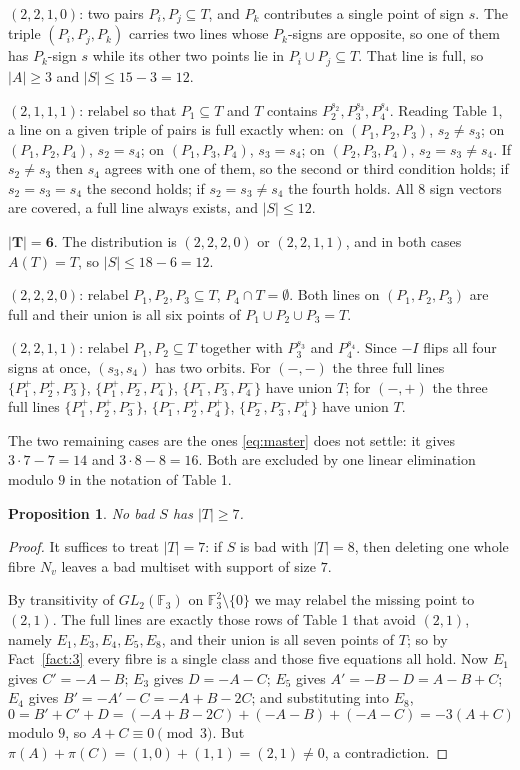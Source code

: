 \documentclass[11pt]{amsart}
\newtheorem{proposition}[theorem]{Proposition}
\newcommand{\FF}{\mathbb F}
\newcommand{\pio}{\pi}
\begin{document}
\emph{$(2,2,1,0)$}: two pairs $P_i,P_j\subseteq T$, and $P_k$ contributes a
single point of sign $s$. The triple $(P_i,P_j,P_k)$ carries two lines whose
$P_k$-signs are opposite, so one of them has $P_k$-sign $s$ while its other two
points lie in $P_i\cup P_j\subseteq T$. That line is full, so $|A|\ge3$ and
$|S|\le15-3=12$.

\emph{$(2,1,1,1)$}: relabel so that $P_1\subseteq T$ and $T$ contains
$P_2^{s_2},P_3^{s_3},P_4^{s_4}$. Reading Table 1, a line on a given triple of
pairs is full exactly when: on $(P_1,P_2,P_3)$, $s_2\ne s_3$; on
$(P_1,P_2,P_4)$, $s_2=s_4$; on $(P_1,P_3,P_4)$, $s_3=s_4$; on $(P_2,P_3,P_4)$,
$s_2=s_3\ne s_4$. If $s_2\ne s_3$ then $s_4$ agrees with one of them, so the
second or third condition holds; if $s_2=s_3=s_4$ the second holds; if
$s_2=s_3\ne s_4$ the fourth holds. All $8$ sign vectors are covered, a full
line always exists, and $|S|\le12$.

\smallskip
\noindent$\boldsymbol{|T|=6}$. The distribution is $(2,2,2,0)$ or $(2,2,1,1)$,
and in both cases $A(T)=T$, so $|S|\le18-6=12$.

\emph{$(2,2,2,0)$}: relabel $P_1,P_2,P_3\subseteq T$, $P_4\cap T=\emptyset$.
Both lines on $(P_1,P_2,P_3)$ are full and their union is all six points of
$P_1\cup P_2\cup P_3=T$.

\emph{$(2,2,1,1)$}: relabel $P_1,P_2\subseteq T$ together with $P_3^{s_3}$ and
$P_4^{s_4}$. Since $-I$ flips all four signs at once, $(s_3,s_4)$ has two
orbits. For $(-,-)$ the three full lines $\{P_1^+,P_2^+,P_3^-\}$,
$\{P_1^+,P_2^-,P_4^-\}$, $\{P_1^-,P_3^-,P_4^-\}$ have union $T$; for $(-,+)$
the three full lines $\{P_1^+,P_2^+,P_3^-\}$, $\{P_1^-,P_2^+,P_4^+\}$,
$\{P_2^-,P_3^-,P_4^+\}$ have union $T$.

\smallskip
The two remaining cases are the ones \eqref{eq:master} does not settle: it gives
$3\cdot7-7=14$ and $3\cdot8-8=16$. Both are excluded by one linear elimination
modulo $9$ in the notation of Table 1.

\begin{proposition}\label{prop:T7}
No bad $S$ has $|T|\ge7$.
\end{proposition}

\begin{proof}
It suffices to treat $|T|=7$: if $S$ is bad with $|T|=8$, then deleting one whole
fibre $N_v$ leaves a bad multiset with support of size $7$.

By transitivity of $GL_2(\FF_3)$ on $\FF_3^2\setminus\{0\}$ we may relabel the
missing point to $(2,1)$. The full lines are exactly those rows of Table 1 that
avoid $(2,1)$, namely $E_1,E_3,E_4,E_5,E_8$, and their union is all seven points
of $T$; so by Fact~\ref{fact:3} every fibre is a single class and those five
equations all hold. Now $E_1$ gives $C'=-A-B$; $E_3$ gives $D=-A-C$; $E_5$ gives
$A'=-B-D=A-B+C$; $E_4$ gives $B'=-A'-C=-A+B-2C$; and substituting into $E_8$,
\[
  0=B'+C'+D=(-A+B-2C)+(-A-B)+(-A-C)=-3(A+C)
\]
modulo $9$, so $A+C\equiv0\pmod 3$. But $\pio(A)+\pio(C)=(1,0)+(1,1)=(2,1)\ne0$, a
contradiction.
\end{proof}
\end{document}
